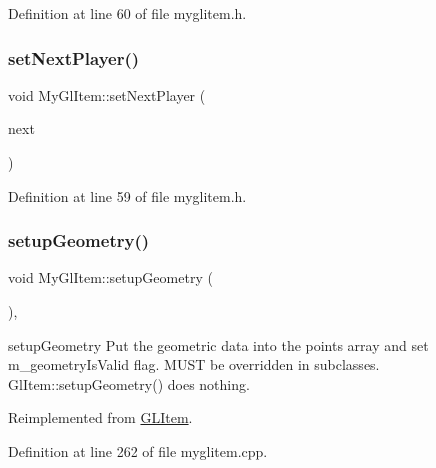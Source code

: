 Definition at line 60 of file myglitem.\+h.

\mbox{\label{class_my_gl_item_a846c52113dee3039823114ace76ad670}} 
\subsubsection{\texorpdfstring{setNextPlayer()}{setNextPlayer()}}
{\footnotesize\ttfamily void My\+Gl\+Item\+::set\+Next\+Player (\begin{DoxyParamCaption}\item[{const Q\+String}]{next }\end{DoxyParamCaption})\hspace{0.3cm}{\ttfamily [inline]}}



Definition at line 59 of file myglitem.\+h.

\mbox{\label{class_my_gl_item_a27704a445b6915b4f365193bf0cab618}} 
\subsubsection{\texorpdfstring{setupGeometry()}{setupGeometry()}}
{\footnotesize\ttfamily void My\+Gl\+Item\+::setup\+Geometry (\begin{DoxyParamCaption}{ }\end{DoxyParamCaption})\hspace{0.3cm}{\ttfamily [override]}, {\ttfamily [virtual]}}



setup\+Geometry Put the geometric data into the points array and set m\+\_\+geometry\+Is\+Valid flag. M\+U\+ST be overridden in subclasses. Gl\+Item\+::setup\+Geometry() does nothing. 



Reimplemented from \mbox{\hyperlink{class_g_l_item_a74269f515d4d025149cc8a603d8c66f1}{G\+L\+Item}}.



Definition at line 262 of file myglitem.\+cpp.

\mbox{\label{class_my_gl_item_adbaf81ef21b3437d37571fa897594550}} 
